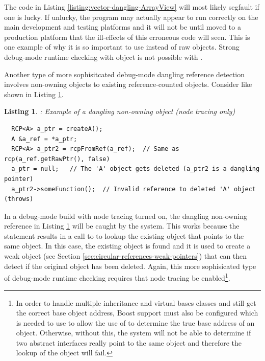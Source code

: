 \documentclass[pdf,ps2pdf,11pt]{SANDreport}
\newtheorem{listing}{Listing}
\begin{document}
The code in Listing {}\ref{listing:vector-dangling-ArrayView} will
most likely segfault if one is lucky.  If unlucky, the program may
actually appear to run correctly on the main development and testing
platforms and it will not be until moved to a production platform that
the ill-effects of this erroneous code will seen.  This is one example
of why it is so important to use {} instead of raw
{} objects.  Strong debug-mode runtime checking with
{} object is not possible with {}.

Another type of more sophisitcated debug-mode dangling reference
detection involves non-owning {} objects to existing
reference-counted objects.  Consider like shown in Listing
{}\ref{listing:RCP-nonowning-dangling-ref}.

\begin{listing}: Example of a dangling non-owning {} object
(node tracing only) \\
\label{listing:RCP-nonowning-dangling-ref}
{\small\begin{verbatim}
  RCP<A> a_ptr = createA();
  A &a_ref = *a_ptr;
  RCP<A> a_ptr2 = rcpFromRef(a_ref);  // Same as rcp(a_ref.getRawPtr(), false)
  a_ptr = null;   // The 'A' object gets deleted (a_ptr2 is a dangling pointer)
  a_ptr2->someFunction();  // Invalid reference to deleted 'A' object (throws)
\end{verbatim}}
\end{listing}

In a debug-mode build with node tracing turned on, the dangling
non-owning {} reference in Listing
{}\ref{listing:RCP-nonowning-dangling-ref} will be caught by the
system.  This works because the statement
{} results in a call to
{} to lookup the
existing {} object that points to the same
{} object.  In this case, the existing {}
object is found and it is used to create a weak {} object
(see Section {}\ref{sec:circular-references-weak-pointers}) that can
then detect if the original {} object has been deleted.
Again, this more sophisicated type of debug-mode runtime checking
requires that node tracing be enabled\footnote{In order to handle
multiple inheritance and virtual bases classes and still get the
correct base object address, Boost support must also be configured
which is needed to use {} to allow the
use of {} to determine the true base
address of an object.  Otherwise, without this, the system will not be
able to determine if two abstract interfaces really point to the same
object and therefore the lookup of the {} object will
fail.}.
\end{document}
